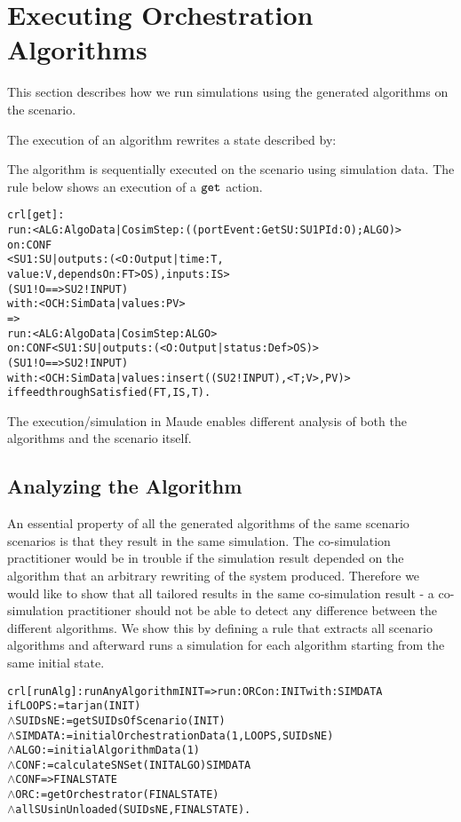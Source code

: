 
\section{Executing Orchestration Algorithms}
This section describes how we run simulations using the generated algorithms on the scenario.

The execution of an algorithm rewrites a state described by:
\begin{alltt}
    
\end{alltt}
The algorithm is sequentially executed on the scenario using simulation data.
The rule below shows an execution of a $\mathtt{get}_{}$ action.

\begin{alltt}
\small
crl [get] : 
run: < ALG : AlgoData | CosimStep : ((portEvent: Get SU: SU1 PId: O) ; ALGO) >
on: CONF
    < SU1 : SU | outputs : (< O : Output | time : T, 
value : V, dependsOn : FT > OS), inputs : IS > 
    ( SU1 ! O ==> SU2 ! INPUT)
with: < OCH : SimData | values : PV >
=> 
run: < ALG : AlgoData | CosimStep : ALGO >
on: CONF < SU1 : SU | outputs : (< O : Output | status : Def > OS) > 
            ( SU1 ! O ==> SU2 ! INPUT)
with: < OCH : SimData | values : insert((SU2 ! INPUT), < T ; V >, PV) > 
if feedthroughSatisfied(FT, IS, T) .
\end{alltt}

The execution/simulation in Maude enables different analysis of both the algorithms and the scenario itself.

\subsection{Analyzing the Algorithm}
An essential property of all the generated algorithms of the same scenario scenarios is that they result in the same simulation.
The co-simulation practitioner would be in trouble if the simulation result depended on the algorithm that an arbitrary rewriting of the system produced.
Therefore we would like to show that all tailored results in the same co-simulation result - a co-simulation practitioner should not be able to detect any difference between the different algorithms.
We show this by defining a rule that extracts all scenario algorithms and afterward runs a simulation for each algorithm starting from the same initial state.

\begin{alltt}
  \small
crl [runAlg] : runAnyAlgorithm INIT => run: ORC on: INIT with: SIMDATA
  if LOOPS := tarjan(INIT)
  \(\land\) SUIDsNE := getSUIDsOfScenario(INIT)
  \(\land\) SIMDATA := initialOrchestrationData(1,LOOPS,SUIDsNE)
  \(\land\) ALGO := initialAlgorithmData(1)
  \(\land\) CONF := calculateSNSet(INIT ALGO) SIMDATA 
  \(\land\) {CONF} => { FINALSTATE } 
  \(\land\) ORC := getOrchestrator(FINALSTATE)
  \(\land\) allSUsinUnloaded(SUIDsNE, FINALSTATE) .
\end{alltt}

